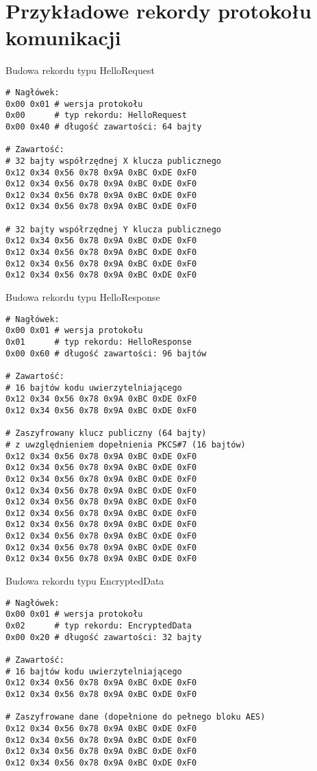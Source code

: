 \chapter{Przykładowe rekordy protokołu komunikacji}
\label{app:samplerecords}

\begin{table}[h]
\centering
\caption{Budowa rekordu typu HelloRequest}
\begin{BVerbatim}
# Nagłówek:
0x00 0x01 # wersja protokołu
0x00      # typ rekordu: HelloRequest
0x00 0x40 # długość zawartości: 64 bajty

# Zawartość:
# 32 bajty współrzędnej X klucza publicznego
0x12 0x34 0x56 0x78 0x9A 0xBC 0xDE 0xF0
0x12 0x34 0x56 0x78 0x9A 0xBC 0xDE 0xF0
0x12 0x34 0x56 0x78 0x9A 0xBC 0xDE 0xF0
0x12 0x34 0x56 0x78 0x9A 0xBC 0xDE 0xF0

# 32 bajty współrzędnej Y klucza publicznego
0x12 0x34 0x56 0x78 0x9A 0xBC 0xDE 0xF0
0x12 0x34 0x56 0x78 0x9A 0xBC 0xDE 0xF0
0x12 0x34 0x56 0x78 0x9A 0xBC 0xDE 0xF0
0x12 0x34 0x56 0x78 0x9A 0xBC 0xDE 0xF0
\end{BVerbatim}
\label{fig:hellorequestsample}
\end{table}

\begin{table}
\centering
\caption{Budowa rekordu typu HelloResponse}
\begin{BVerbatim}
# Nagłówek:
0x00 0x01 # wersja protokołu
0x01      # typ rekordu: HelloResponse
0x00 0x60 # długość zawartości: 96 bajtów

# Zawartość:
# 16 bajtów kodu uwierzytelniającego
0x12 0x34 0x56 0x78 0x9A 0xBC 0xDE 0xF0
0x12 0x34 0x56 0x78 0x9A 0xBC 0xDE 0xF0

# Zaszyfrowany klucz publiczny (64 bajty)
# z uwzględnieniem dopełnienia PKCS#7 (16 bajtów)
0x12 0x34 0x56 0x78 0x9A 0xBC 0xDE 0xF0
0x12 0x34 0x56 0x78 0x9A 0xBC 0xDE 0xF0
0x12 0x34 0x56 0x78 0x9A 0xBC 0xDE 0xF0
0x12 0x34 0x56 0x78 0x9A 0xBC 0xDE 0xF0
0x12 0x34 0x56 0x78 0x9A 0xBC 0xDE 0xF0
0x12 0x34 0x56 0x78 0x9A 0xBC 0xDE 0xF0
0x12 0x34 0x56 0x78 0x9A 0xBC 0xDE 0xF0
0x12 0x34 0x56 0x78 0x9A 0xBC 0xDE 0xF0
0x12 0x34 0x56 0x78 0x9A 0xBC 0xDE 0xF0
0x12 0x34 0x56 0x78 0x9A 0xBC 0xDE 0xF0
\end{BVerbatim}
\label{fig:helloresponsesample}
\end{table}

\begin{table}
\centering
\caption{Budowa rekordu typu EncryptedData}
\begin{BVerbatim}
# Nagłówek:
0x00 0x01 # wersja protokołu
0x02      # typ rekordu: EncryptedData
0x00 0x20 # długość zawartości: 32 bajty

# Zawartość:
# 16 bajtów kodu uwierzytelniającego
0x12 0x34 0x56 0x78 0x9A 0xBC 0xDE 0xF0
0x12 0x34 0x56 0x78 0x9A 0xBC 0xDE 0xF0

# Zaszyfrowane dane (dopełnione do pełnego bloku AES)
0x12 0x34 0x56 0x78 0x9A 0xBC 0xDE 0xF0
0x12 0x34 0x56 0x78 0x9A 0xBC 0xDE 0xF0
0x12 0x34 0x56 0x78 0x9A 0xBC 0xDE 0xF0
0x12 0x34 0x56 0x78 0x9A 0xBC 0xDE 0xF0
\end{BVerbatim}
\label{fig:encrypteddatasample}
\end{table}
